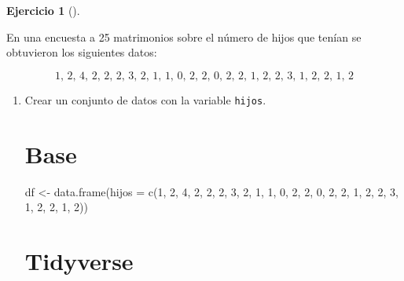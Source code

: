 \documentclass[
  a4paper,
]{scrreport}
\newenvironment{Shaded}{\begin{snugshade}}{\end{snugshade}}
\newcommand{\AttributeTok}[1]{\textcolor[rgb]{0.40,0.45,0.13}{#1}}
\newcommand{\DecValTok}[1]{\textcolor[rgb]{0.68,0.00,0.00}{#1}}
\newcommand{\FunctionTok}[1]{\textcolor[rgb]{0.28,0.35,0.67}{#1}}
\newcommand{\NormalTok}[1]{\textcolor[rgb]{0.00,0.23,0.31}{#1}}
\newcommand{\OtherTok}[1]{\textcolor[rgb]{0.00,0.23,0.31}{#1}}
\theoremstyle{definition}
\newtheorem{exercise}{Ejercicio}[chapter]
\theoremstyle{remark}
\begin{document}
\begin{exercise}[]\protect\hypertarget{exr-frecuencias-graficos-hijos}{}\label{exr-frecuencias-graficos-hijos}

En una encuesta a 25 matrimonios sobre el número de hijos que tenían se
obtuvieron los siguientes datos:

\[
\mbox{1, 2, 4, 2, 2, 2, 3, 2, 1, 1, 0, 2, 2, 0, 2, 2, 1, 2, 2, 3, 1, 2, 2, 1, 2}
\]

\begin{enumerate}
\def\labelenumi{\alph{enumi}.}
\item
  Crear un conjunto de datos con la variable \texttt{hijos}.

  \begin{tcolorbox}[enhanced jigsaw, colframe=quarto-callout-tip-color-frame, toprule=.15mm, bottomtitle=1mm, breakable, opacitybacktitle=0.6, toptitle=1mm, colback=white, bottomrule=.15mm, title=\textcolor{quarto-callout-tip-color}{\faLightbulb}\hspace{0.5em}{Solución}, arc=.35mm, left=2mm, titlerule=0mm, rightrule=.15mm, coltitle=black, leftrule=.75mm, opacityback=0, colbacktitle=quarto-callout-tip-color!10!white]

  \section{Base}

\begin{Shaded}
\begin{Highlighting}[]
\NormalTok{df }\OtherTok{\textless{}{-}} \FunctionTok{data.frame}\NormalTok{(}\AttributeTok{hijos =} \FunctionTok{c}\NormalTok{(}\DecValTok{1}\NormalTok{, }\DecValTok{2}\NormalTok{, }\DecValTok{4}\NormalTok{, }\DecValTok{2}\NormalTok{, }\DecValTok{2}\NormalTok{, }\DecValTok{2}\NormalTok{, }\DecValTok{3}\NormalTok{, }\DecValTok{2}\NormalTok{, }\DecValTok{1}\NormalTok{, }\DecValTok{1}\NormalTok{, }\DecValTok{0}\NormalTok{, }\DecValTok{2}\NormalTok{, }\DecValTok{2}\NormalTok{, }\DecValTok{0}\NormalTok{, }\DecValTok{2}\NormalTok{, }\DecValTok{2}\NormalTok{, }\DecValTok{1}\NormalTok{, }\DecValTok{2}\NormalTok{, }\DecValTok{2}\NormalTok{, }\DecValTok{3}\NormalTok{, }\DecValTok{1}\NormalTok{, }\DecValTok{2}\NormalTok{, }\DecValTok{2}\NormalTok{, }\DecValTok{1}\NormalTok{, }\DecValTok{2}\NormalTok{))}
\end{Highlighting}
\end{Shaded}

  \section{Tidyverse}


\end{tcolorbox}
\end{enumerate}
\end{exercise}
\end{document}
